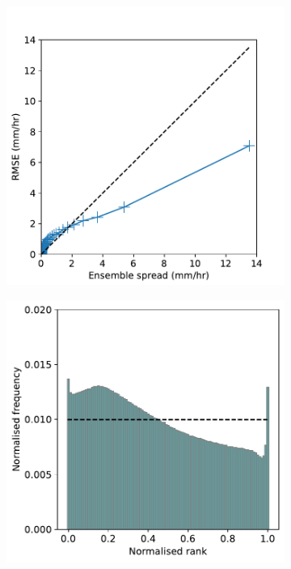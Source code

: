 \documentclass[../main.tex]{subfiles}
\begin{document}
\begin{figure}[!ht]
    \centering
    \begin{subfigure}[t]{0.49\textwidth}
     \includegraphics[width=\textwidth]{images/spread_error_final-nologs_217600.pdf}
     \caption{}
     \end{subfigure}
     \centering
    \begin{subfigure}[t]{0.49\textwidth}
     \includegraphics[width=\textwidth]{images/rank_hist_final-nologs_217600.pdf}

\end{subfigure}
\end{figure}
\end{document}
